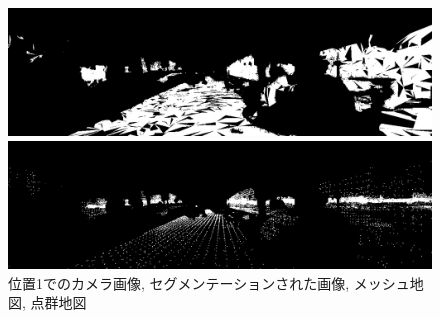 \begin{figure}[htbp]
\begin{minipage}[b]{0.50\hsize}
\begin{center}
  \end{center}
 \end{minipage} \\
  \begin{minipage}[b]{0.50\hsize}
 \begin{center}
  \includegraphics[keepaspectratio, scale=0.18]{./picture/valued_mesh_map_image/image0.jpg}
  \end{center}
 \end{minipage}
 \begin{minipage}[b]{0.50\hsize}
 \begin{center}
  \includegraphics[keepaspectratio, scale=0.18]{./picture/valued_point_map_image/image0.jpg}
  \end{center}
 \end{minipage}
 \caption{位置1でのカメラ画像, セグメンテーションされた画像, メッシュ地図, 点群地図}\label{fig:place1}
\end{figure}

\par


